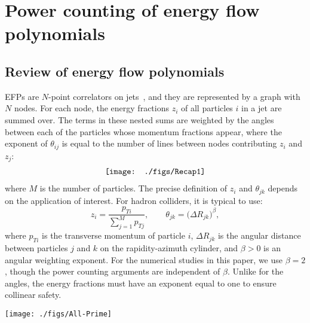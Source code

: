\documentclass[a4paper,11pt]{article}
\begin{document}
\section{Power counting of energy flow polynomials ~\label{sec:EFPreview}}

\subsection{Review of energy flow polynomials}

EFPs are $N$-point correlators on jets~\cite{Komiske:2017aww}, and they are represented by a graph with $N$ nodes.
%
For each node, the energy fractions $z_i$ of all particles $i$ in a jet are summed over.
%
The terms in these nested sums are weighted by the angles between each of the particles whose momentum fractions appear, where the exponent of $\theta_{ij}$ is equal to the number of lines between nodes contributing $z_i$ and $z_j$:
%
\begin{align}
 \texttt{[image: ./figs/Recap1]}  \raisetag{2.0\baselineskip} 
\end{align}
where $M$ is the number of particles.
%
The precise definition of $z_i$ and $\theta_{jk}$ depends on the application of interest.
%
For hadron colliders, it is typical to use:
%
\begin{equation}
    z_i = \frac{p_{Ti}}{\sum_{j=1}^M p_{Tj}}, \qquad \theta_{jk} = \big(\Delta R_{jk} \big)^\beta,
\end{equation}
%
where $p_{Ti}$ is the transverse momentum of particle $i$, $\Delta R_{jk}$ is the angular distance between particles $j$ and $k$ on the rapidity-azimuth cylinder, and $\beta > 0$ is an angular weighting exponent.
%
For the numerical studies in this paper, we use $\beta=2$, though the power counting arguments are independent of $\beta$.
%
Unlike for the angles, the energy fractions must have an exponent equal to one to ensure collinear safety.

\begin{table}[t]\centering
 \texttt{[image: ./figs/All-Prime]} \hfill 
 \caption{
 All prime (connected) EFPs up to degree 4.
 For legibility, the numbers indicate the multiplicity of lines connecting the corresponding nodes.
 To form composite EFPs, one multiplies together these prime elements.
 \label{tab:All-Prime-EFPs}}
 \end{table}
\end{document}
